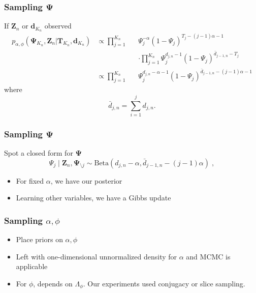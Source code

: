 \documentclass[final,hyperref={pdfpagelabels=false},noamsthm]{beamer}
\newcommand{\ee}{Z} %
\newcommand{\bfee}{\mathbf{\ee}}
\newcommand{\bfT}{\mathbf{T}}
\newcommand{\bfPsi}{\boldsymbol{\Psi}}
\newcommand{\bfd}{\mathbf{d}}
\begin{document}
\begin{frame}
\frametitle{Sampling $\bfPsi$}

If $\bfee_n$ or $\bfd_{K_n}$ observed
\begin{align*}
	p_{\alpha, \phi}(\bfPsi_{K_n}, \bfee_n | \bfT_{K_n}, \bfd_{K_n}) &\propto \prod_{j=1}^{K_n} &&\Psi_j ^{ - \alpha} (1-\Psi_j)^{T_j - (j-1)\alpha - 1} \\
	&&&\cdot \prod_{j=1}^{K_n} \Psi_j^{d_{j,n}-1}(1-\Psi_j)^{\bar{d}_{j-1,n} - T_j}\\
	&\propto \prod_{j=1}^{K_n} &&\Psi_j ^{d_{j,n} - \alpha -1} (1-\Psi_j)^{\bar{d}_{j-1,n} - (j-1)\alpha - 1}
\end{align*}
where
\begin{equation*}
\bar{d}_{j,n} = \sum_{i=1}^j d_{j,n}.
\end{equation*}

\end{frame}

\begin{frame}
	\frametitle{Sampling $\bfPsi$}
	Spot a closed form for $\bfPsi$
	\begin{equation*}
	\Psi_j \mid \bfee_n, \bfPsi_{\setminus j} \sim \text{Beta}(d_{j,n} - \alpha, \bar{d}_{j-1,n} - (j-1)\alpha) \;,
	\end{equation*}
	
	\begin{itemize}
		\item For fixed $\alpha$, we have our posterior
		\item Learning other variables, we have a Gibbs update
	\end{itemize}
\end{frame}

\begin{frame}
	\frametitle{Sampling $\alpha, \phi$}
	\begin{itemize}
		\item Place priors on $\alpha, \phi$
		\item Left with one-dimensional unnormalized density for $\alpha$ and MCMC is applicable
		\item For $\phi$, depends on $\Lambda_\phi$. Our experiments used conjugacy or slice sampling.
	\end{itemize}

\end{frame}
\end{document}
